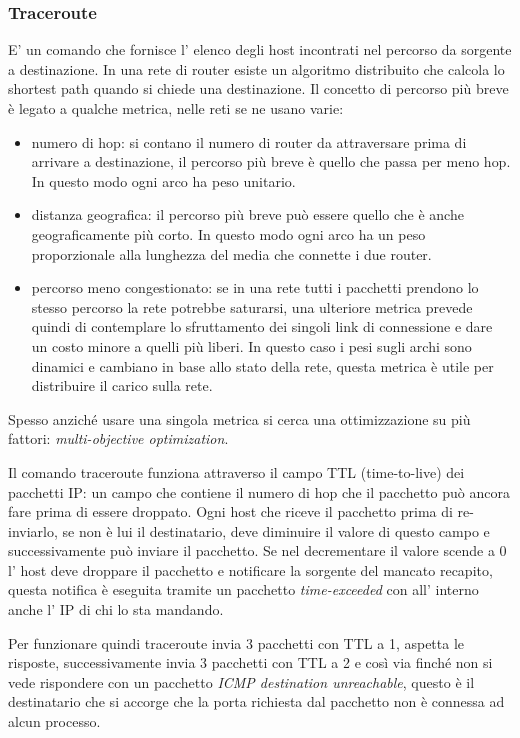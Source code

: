 \subsubsection{Traceroute}
E' un comando che fornisce l' elenco degli host incontrati nel percorso da sorgente a destinazione.
In una rete di router esiste un algoritmo distribuito che calcola lo shortest path quando si chiede una destinazione.
Il concetto di percorso più breve è legato a qualche metrica, nelle reti se ne usano varie:
\begin{itemize}
    \item numero di hop: si contano il numero di router da attraversare prima di arrivare a destinazione, il percorso più breve è quello che passa per meno hop.
    In questo modo ogni arco ha peso unitario.
    
    \item distanza geografica: il percorso più breve può essere quello che è anche geograficamente più corto.
    In questo modo ogni arco ha un peso proporzionale alla lunghezza del media che connette i due router.
    
    \item percorso meno congestionato: se in una rete tutti i pacchetti prendono lo stesso percorso la rete potrebbe saturarsi, una ulteriore metrica prevede quindi di contemplare lo sfruttamento dei singoli link di connessione e dare un costo minore a quelli più liberi.
    In questo caso i pesi sugli archi sono dinamici e cambiano in base allo stato della rete, questa metrica è utile per distribuire il carico sulla rete.
\end{itemize}
Spesso anziché usare una singola metrica si cerca una ottimizzazione su più fattori: \emph{multi-objective optimization}.

Il comando traceroute funziona attraverso il campo TTL (time-to-live) dei pacchetti IP: un campo che contiene il numero di hop che il pacchetto può ancora fare prima di essere droppato. 
Ogni host che riceve il pacchetto prima di re-inviarlo, se non è lui il destinatario, deve diminuire il valore di questo campo e successivamente può inviare il pacchetto.
Se nel decrementare il valore scende a 0 l' host deve droppare il pacchetto e notificare la sorgente del mancato recapito, questa notifica è eseguita tramite un pacchetto \emph{time-exceeded} con all' interno anche l' IP di chi lo sta mandando.

Per funzionare quindi traceroute invia 3 pacchetti con TTL a 1, aspetta le risposte, successivamente invia 3 pacchetti con TTL a 2 e così via finché non si vede rispondere con un pacchetto \emph{ICMP destination unreachable}, questo è il destinatario che si accorge che la porta richiesta dal pacchetto non è connessa ad alcun processo.

